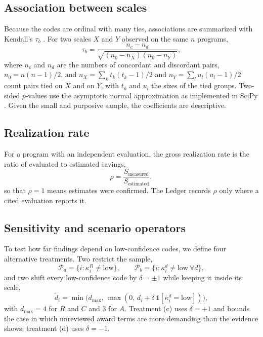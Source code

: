 \documentclass[10pt,twocolumn,letterpaper]{article}
\begin{document}
\subsection{Association between scales}

Because the codes are ordinal with many ties, associations are summarized with Kendall's $\tau_b$ \cite{kendall1945}. For two scales $X$ and $Y$ observed on the same $n$ programs,
\begin{equation}
\tau_b = \frac{n_c - n_d}{\sqrt{(n_0 - n_X)(n_0 - n_Y)}},
\label{eq:tau}
\end{equation}
where $n_c$ and $n_d$ are the numbers of concordant and discordant pairs, $n_0 = n(n-1)/2$, and $n_X = \sum_k t_k(t_k-1)/2$ and $n_Y = \sum_l u_l(u_l-1)/2$ count pairs tied on $X$ and on $Y$, with $t_k$ and $u_l$ the sizes of the tied groups. Two-sided $p$-values use the asymptotic normal approximation as implemented in SciPy \cite{virtanen2020}. Given the small and purposive sample, the coefficients are descriptive.

\subsection{Realization rate}

For a program with an independent evaluation, the gross realization rate is the ratio of evaluated to estimated savings,
\begin{equation}
\rho = \frac{S_{\text{measured}}}{S_{\text{estimated}}},
\label{eq:rr}
\end{equation}
so that $\rho = 1$ means estimates were confirmed. The Ledger records $\rho$ only where a cited evaluation reports it.

\subsection{Sensitivity and scenario operators}

To test how far findings depend on low-confidence codes, we define four alternative treatments. Two restrict the sample,
\begin{equation}
\mathcal{P}_a = \{ i : \kappa_i^R \neq \text{low} \}, \qquad \mathcal{P}_b = \{ i : \kappa_i^d \neq \text{low}\ \forall d \},
\label{eq:excl}
\end{equation}
and two shift every low-confidence code by $\delta = \pm 1$ while keeping it inside its scale,
\begin{equation}
\tilde{d}_i = \min\!\big(d_{\max},\, \max(0,\, d_i + \delta\,\mathbf{1}[\kappa_i^d = \text{low}])\big),
\label{eq:shift}
\end{equation}
with $d_{\max} = 4$ for $R$ and $C$ and $3$ for $A$. Treatment (c) uses $\delta = +1$ and bounds the case in which unreviewed award terms are more demanding than the evidence shows; treatment (d) uses $\delta = -1$.
\end{document}
